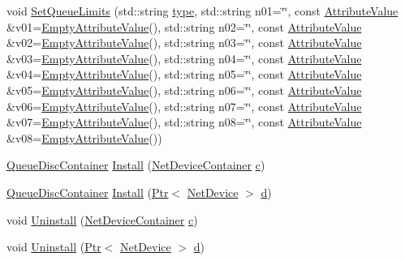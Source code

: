 \begin{DoxyCompactItemize}
\item 
void \hyperlink{classns3_1_1TrafficControlHelper_aa440af34207fcb477a88186a8c386f6d}{Set\+Queue\+Limits} (std\+::string \hyperlink{visualizer-ideas_8txt_add98db9e15e2a58cf2b57623e7aa893a}{type}, std\+::string n01=\char`\"{}\char`\"{}, const \hyperlink{classns3_1_1AttributeValue}{Attribute\+Value} \&v01=\hyperlink{classns3_1_1EmptyAttributeValue}{Empty\+Attribute\+Value}(), std\+::string n02=\char`\"{}\char`\"{}, const \hyperlink{classns3_1_1AttributeValue}{Attribute\+Value} \&v02=\hyperlink{classns3_1_1EmptyAttributeValue}{Empty\+Attribute\+Value}(), std\+::string n03=\char`\"{}\char`\"{}, const \hyperlink{classns3_1_1AttributeValue}{Attribute\+Value} \&v03=\hyperlink{classns3_1_1EmptyAttributeValue}{Empty\+Attribute\+Value}(), std\+::string n04=\char`\"{}\char`\"{}, const \hyperlink{classns3_1_1AttributeValue}{Attribute\+Value} \&v04=\hyperlink{classns3_1_1EmptyAttributeValue}{Empty\+Attribute\+Value}(), std\+::string n05=\char`\"{}\char`\"{}, const \hyperlink{classns3_1_1AttributeValue}{Attribute\+Value} \&v05=\hyperlink{classns3_1_1EmptyAttributeValue}{Empty\+Attribute\+Value}(), std\+::string n06=\char`\"{}\char`\"{}, const \hyperlink{classns3_1_1AttributeValue}{Attribute\+Value} \&v06=\hyperlink{classns3_1_1EmptyAttributeValue}{Empty\+Attribute\+Value}(), std\+::string n07=\char`\"{}\char`\"{}, const \hyperlink{classns3_1_1AttributeValue}{Attribute\+Value} \&v07=\hyperlink{classns3_1_1EmptyAttributeValue}{Empty\+Attribute\+Value}(), std\+::string n08=\char`\"{}\char`\"{}, const \hyperlink{classns3_1_1AttributeValue}{Attribute\+Value} \&v08=\hyperlink{classns3_1_1EmptyAttributeValue}{Empty\+Attribute\+Value}())
\item 
\hyperlink{classns3_1_1QueueDiscContainer}{Queue\+Disc\+Container} \hyperlink{classns3_1_1TrafficControlHelper_a0aa6a8e2fbb1c196589e16f48c99f0b9}{Install} (\hyperlink{classns3_1_1NetDeviceContainer}{Net\+Device\+Container} \hyperlink{mmwave_2model_2fading-traces_2fading__trace__generator_8m_ae0323a9039add2978bf5b49550572c7c}{c})
\item 
\hyperlink{classns3_1_1QueueDiscContainer}{Queue\+Disc\+Container} \hyperlink{classns3_1_1TrafficControlHelper_a49a5284afc08a97e343420a0d62a708c}{Install} (\hyperlink{classns3_1_1Ptr}{Ptr}$<$ \hyperlink{classns3_1_1NetDevice}{Net\+Device} $>$ \hyperlink{lte__pathloss_8m_a1aabac6d068eef6a7bad3fdf50a05cc8}{d})
\item 
void \hyperlink{classns3_1_1TrafficControlHelper_a84a2d6a074daccf9373e17b876420aae}{Uninstall} (\hyperlink{classns3_1_1NetDeviceContainer}{Net\+Device\+Container} \hyperlink{mmwave_2model_2fading-traces_2fading__trace__generator_8m_ae0323a9039add2978bf5b49550572c7c}{c})
\item 
void \hyperlink{classns3_1_1TrafficControlHelper_a1b55be6f3ad9d7376ff5f7f480bf8209}{Uninstall} (\hyperlink{classns3_1_1Ptr}{Ptr}$<$ \hyperlink{classns3_1_1NetDevice}{Net\+Device} $>$ \hyperlink{lte__pathloss_8m_a1aabac6d068eef6a7bad3fdf50a05cc8}{d})
\end{DoxyCompactItemize}
